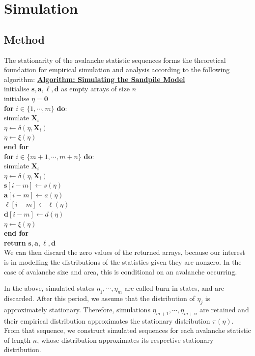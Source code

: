\chapter{Simulation}

\section{Method}

The stationarity of the avalanche statistic sequences forms the theoretical foundation for empirical simulation and analysis according to the following algorithm:
\underline{\textbf{Algorithm: Simulating the Sandpile Model}}\\
initialise $\mathbf{s}, \mathbf{a}, \mathbf{\ell}, \mathbf{d}$ as empty arrays of size $n$ \\
initialise $\eta = \mathbf{0}$\\
\textbf{for} $i \in \{1, \cdots, m \}$ \textbf{do}: \\
simulate $\mathbf{X}_i$\\
$\eta \gets \delta(\eta, \mathbf{X}_i)$\\
$\eta \gets \xi(\eta)$\\
\textbf{end for}\\
\textbf{for} $i \in \{m + 1, \cdots, m + n \}$ \textbf{do}: \\
simulate $\mathbf{X}_i$\\
$\eta \gets \delta(\eta, \mathbf{X}_i)$\\
$\mathbf{s}[i-m] \gets s(\eta)$\\
$\mathbf{a}[i-m] \gets a(\eta)$\\
$\mathbf{\ell}[i-m] \gets \ell(\eta)$\\
$\mathbf{d}[i-m] \gets d(\eta)$\\
$\eta \gets \xi(\eta)$\\
\textbf{end for}\\
\textbf{return} $\mathbf{s}, \mathbf{a}, \mathbf{\ell}, \mathbf{d}$\\

We can then discard the zero values of the returned arrays, because our interest is in modelling the distributions of the statistics given they are nonzero. In the case of avalanche size and area, this is conditional on an avalanche occurring.

In the above, simulated states $\eta_1, \cdots, \eta_m$ are called burn-in states, and are discarded. After this period, we assume that the distribution of $\eta_j$ is approximately stationary. Therefore, simulations $\eta_{m+1}, \cdots, \eta_{m+n}$ are retained and their empirical distribution approximates the stationary distribution $\pi(\eta)$. From that sequence, we construct simulated sequences for each avalanche statistic of length $n$, whose distribution approximates its respective stationary distribution.

